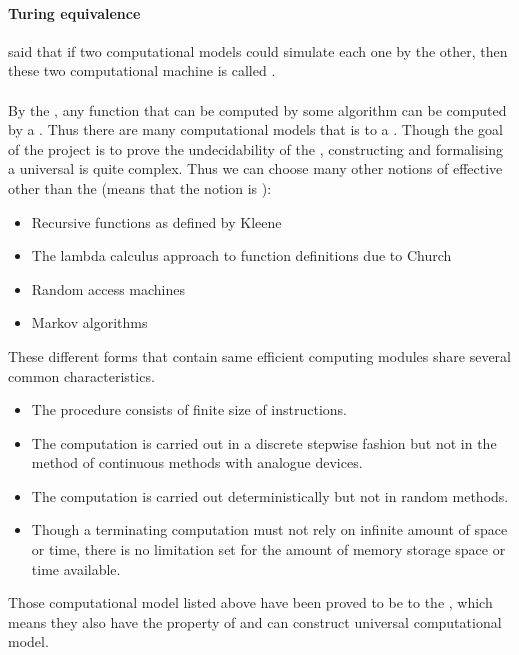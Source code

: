 \paragraph{Turing equivalence} said that if two computational models could simulate each one by the other, then these two computational machine is called \cite{rogers_theory_1987}.\\\\
By the , any function that can be computed by some algorithm can be computed by a \cite{church_unsolvable_1936}.
Thus there are many computational models that is  to a \cite{copeland_church-turing_2002}.
Though the goal of the project is to prove the undecidability of the , constructing and formalising a universal  is quite complex. 
Thus we can choose many other notions of effective other than the  (means that the notion is ):
\begin{itemize}
  \item Recursive functions as defined by Kleene\cite{yasuhara_recursive_1971}
  \item The lambda calculus approach to function definitions due to Church\cite{moggi_computational_1988}
  \item Random access machines\cite{cook_time-bounded_1972}
  \item Markov algorithms\cite{_markov_2015}
\end{itemize}
These different forms that contain same efficient computing modules share several common characteristics\cite{jones_computability_1997}.
\begin{itemize}
  \item The procedure consists of finite size of instructions.
  \item The computation is carried out in a discrete stepwise fashion but not in the method of continuous methods with analogue devices.
  \item The computation is carried out deterministically but not in random methods.
  \item Though a terminating computation must not rely on infinite amount of space or time, there is no limitation set for the amount of memory storage space or time available.
\end{itemize}
Those computational model listed above have been proved to be  to the , which means they also have the property of  and can construct universal computational model.
